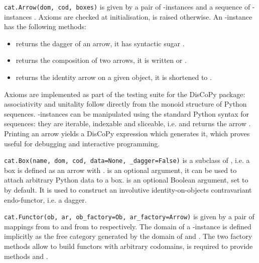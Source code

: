 \begin{class}\normalfont\texttt{cat.Arrow(dom, cod, boxes)} is given by a pair of -instances
 and a sequence of -instances .
Axioms are checked at initialisation,  is raised otherwise.
An -instance  has the following methods:

\begin{itemize}
\item {} returns the dagger of an arrow,
it has syntactic sugar .
\item {} returns the composition of two arrows,
it is written  or .
\item {} returns the identity arrow
on a given object, it is shortened to .
\end{itemize}
Axioms are implemented as part of the testing suite for the DisCoPy
package: associativity 
\s {} and unitality
 follow directly from the monoid
structure of Python sequences.
-instances can be manipulated using the standard Python syntax for
sequences: they are iterable, indexable and sliceable, i.e.
 and  returns the arrow 
.
Printing an arrow yields a DisCoPy expression which generates it,
which proves useful for debugging and interactive programming.
\end{class}

\begin{class}\normalfont\texttt{cat.Box(name, dom, cod, data=None, \_dagger=False)} is a subclass of , i.e. a box  is defined as an arrow with .
 is an optional argument, it can be used to attach arbitrary Python data to a box.
 is an optional Boolean argument, set to  by default.
It is used to construct an involutive identity-on-objects contravariant endo-functor, i.e. a dagger.
\end{class}

\begin{class}\normalfont\texttt{cat.Functor(ob, ar, ob\_factory=Ob, ar\_factory=Arrow)} is given by a pair of mappings  from  to  and from  to  respectively.
The domain of a -instance  is defined implicitly as the free category generated by the domain of  and .
The two factory methods allow to build functors with arbitrary codomains,  is required to provide methods  and .
\end{class}

